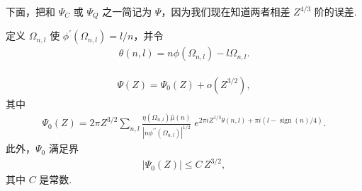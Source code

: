 下面，把和 $\Psi_C$ 或 $\Psi_Q$ 之一简记为 $\Psi$，因为我们现在知道两者相差 $Z^{4/3}$ 阶的误差.

定义 $\Omega_{n,l}$ 使 $\phi^{\prime}(\Omega_{n,l})=l/n$，并令
\begin{align*}
  \theta(n,l)=n\phi(\Omega_{n,l})-l\Omega_{n,l}.
\end{align*}

\begin{theorem}\label{thm:9.20}
\begin{align*}
  \Psi(Z)=\Psi_{0}(Z)+o(Z^{3/2}),
\end{align*}
其中
\begin{align*}
  \Psi_{0}(Z)=2\pi Z^{3/2}\sum_{n,l}
  \frac{\eta(\Omega_{n,l})\hat{\mu}(n)}{|n\phi^{\prime\prime}(\Omega_{n,l})|^{1/2}}
  \;e^{2\pi i Z^{1/3}\theta(n,l)+\pi i(l-\operatorname{sign}(n)/4)}.
\end{align*}
此外，$\Psi_{0}$ 满足界
\begin{align*}
  |\Psi_{0}(Z)|\leq C\,Z^{3/2},
\end{align*}
其中 $C$ 是常数.
\end{theorem}

